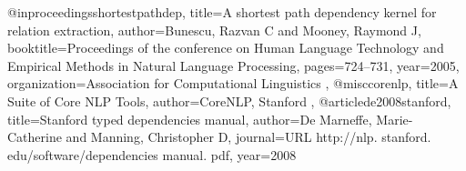 @inproceedings{shortestpathdep,
  title={A shortest path dependency kernel for relation extraction},
  author={Bunescu, Razvan C and Mooney, Raymond J},
  booktitle={Proceedings of the conference on Human Language Technology and Empirical Methods in Natural Language Processing},
  pages={724--731},
  year={2005},
  organization={Association for Computational Linguistics}
},
@misc{corenlp,
  title={A Suite of Core NLP Tools},
  author={CoreNLP, Stanford}
},
@article{de2008stanford,
  title={Stanford typed dependencies manual},
  author={De Marneffe, Marie-Catherine and Manning, Christopher D},
  journal={URL http://nlp. stanford. edu/software/dependencies manual. pdf},
  year={2008}
}